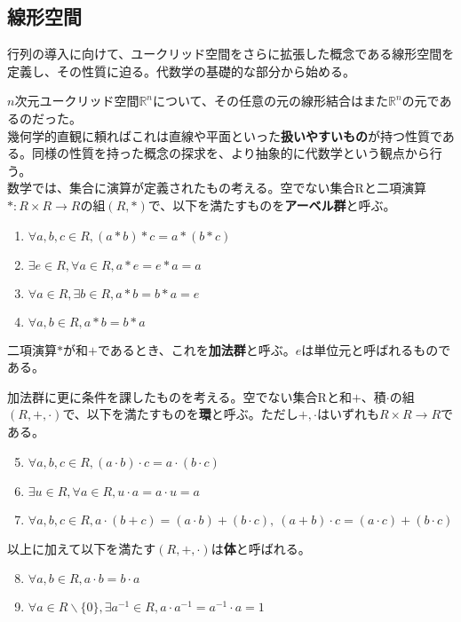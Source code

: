 \documentclass[dvipdfmx]{jsarticle}
\begin{document}
\subsection{線形空間}
行列の導入に向けて、ユークリッド空間をさらに拡張した概念である線形空間を定義し、その性質に迫る。代数学の基礎的な部分から始める。\\\par
\motiv $n$次元ユークリッド空間$\mathbb{R}^n$について、その任意の元の線形結合はまた$\mathbb{R}^n$の元であるのだった。\\
幾何学的直観に頼ればこれは直線や平面といった\textbf{扱いやすいもの}が持つ性質である。同様の性質を持った概念の探求を、より抽象的に代数学という観点から行う。\\
\build 数学では、集合に演算が定義されたもの考える。空でない集合Rと二項演算$\ast:R \times R \to R$の組$(R,\ast)$で、以下を満たすものを\textbf{アーベル群}と呼ぶ。
\begin{enumerate}
\item $\forall a,b,c \in R, (a \ast b) \ast c = a \ast (b \ast c)$
\item $\exists e \in R, \forall a \in R, a \ast e = e \ast a = a$
\item $\forall a \in R, \exists b \in R, a \ast b = b \ast a = e$
\item $\forall a,b \in R, a \ast b = b \ast a$
\end{enumerate}
二項演算$\ast$が和$+$であるとき、これを\textbf{加法群}と呼ぶ。$e$は単位元と呼ばれるものである。\par
加法群に更に条件を課したものを考える。空でない集合Rと和$+$、積$\cdot$の組$(R,+,\cdot)$で、以下を満たすものを\textbf{環}と呼ぶ。ただし$+,\cdot$はいずれも$R \times R \to R$である。
\begin{enumerate}
\setcounter{enumi}{4}
\item $\forall a,b,c \in R, (a \cdot b) \cdot c = a \cdot (b \cdot c)$
\item $\exists u \in R, \forall a \in R, u \cdot a = a \cdot u = a$
\item $\forall a,b,c \in R, a \cdot (b + c) = (a \cdot b) + (b \cdot c),~(a + b) \cdot c = (a \cdot c) + (b \cdot c)$
\end{enumerate}\par
以上に加えて以下を満たす$(R,+,\cdot)$は\textbf{体}と呼ばれる。
\begin{enumerate}
\setcounter{enumi}{7}
\item $\forall a,b \in R,a \cdot b = b \cdot a$
\item $\forall a \in R \backslash \{0\}, \exists a^{-1} \in R, a \cdot a^{-1} = a^{-1} \cdot a = 1$
\end{enumerate}
\end{document}

